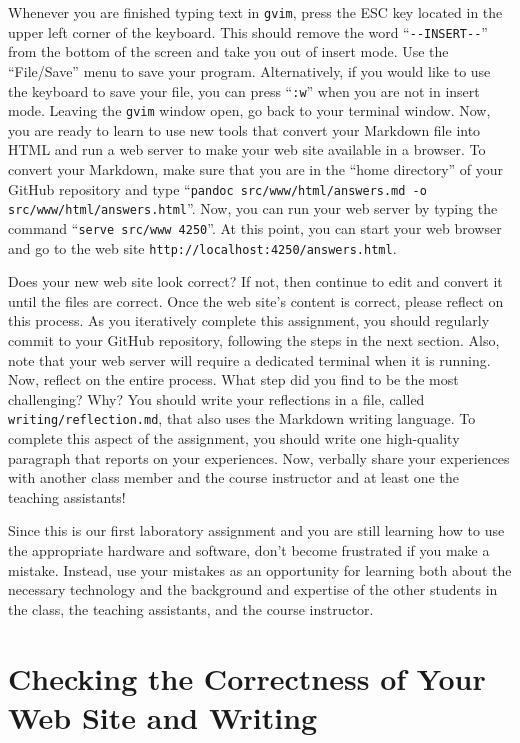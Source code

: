 \documentclass[11pt]{article}
\newcommand{\reflection}{\lstinline{writing/reflection.md}}
\newcommand{\command}[1]{``\lstinline{#1}''}
\newcommand{\program}[1]{\lstinline{#1}}
\newcommand{\url}[1]{\lstinline{#1}}
\newcommand{\option}[1]{``{#1}''}
\begin{document}
Whenever you are finished typing text in \program{gvim}, press the ESC key located in the upper left corner of the
keyboard. This should remove the word \command{--INSERT--} from the bottom of the screen and take you out of insert
mode. Use the \option{File/Save} menu to save your program. Alternatively, if you would like to use the keyboard to save
your file, you can press \command{:w} when you are not in insert mode. Leaving the {\tt gvim} window open, go back to
your terminal window. Now, you are ready to learn to use new tools that convert your Markdown file into HTML and run a
web server to make your web site available in a browser. To convert your Markdown, make sure that you are in the ``home
directory'' of your GitHub repository and type \command{pandoc src/www/html/answers.md -o src/www/html/answers.html}. Now, you can
run your web server by typing the command \command{serve src/www 4250}. At this point, you can start your web browser
and go to the web site \url{http://localhost:4250/answers.html}.

Does your new web site look correct? If not, then continue to edit and convert it until the files are correct. Once the
web site's content is correct, please reflect on this process. As you iteratively complete this assignment, you should
regularly commit to your GitHub repository, following the steps in the next section. Also, note that your web server
will require a dedicated terminal when it is running. Now, reflect on the entire process. What step did you find to be
the most challenging? Why? You should write your reflections in a file, called \reflection{}, that also uses the
Markdown writing language. To complete this aspect of the assignment, you should write one high-quality paragraph that
reports on your experiences. Now, verbally share your experiences with another class member and the course instructor
and at least one the teaching assistants!

Since this is our first laboratory assignment and you are still learning how to use the appropriate hardware and
software, don't become frustrated if you make a mistake. Instead, use your mistakes as an opportunity for learning both
about the necessary technology and the background and expertise of the other students in the class, the teaching
assistants, and the course instructor.

\section*{Checking the Correctness of Your Web Site and Writing}
\end{document}
